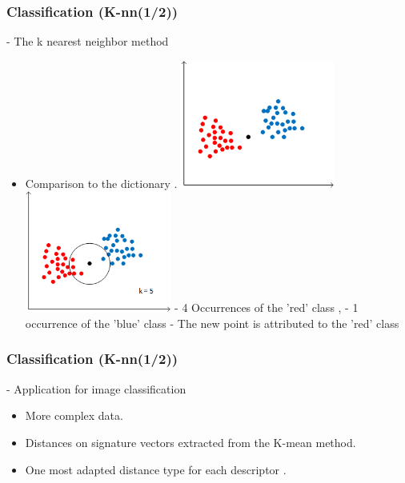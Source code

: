 \documentclass[xcolor=table]{beamer}
\begin{document}
\begin{frame}\frametitle{Classification (K-nn(1/2))}

- The k nearest neighbor method

\begin{itemize}
\item<1-> Comparison to the dictionary .
 {\includegraphics[height=4.2cm]{knnwc.png}} %
 {\includegraphics[height=4cm]{knnac.png}
\newline - 4 Occurrences of the 'red' class , - 1 occurrence of the 'blue' class \newline - The new point is attributed to the 'red' class}
\end{itemize}

\end{frame}

\begin{frame}\frametitle{Classification (K-nn(1/2))}

- Application for image classification

\begin{itemize}
\item More complex data.
\item Distances on signature vectors extracted from the K-mean method.
\item One most adapted distance type for each descriptor .
\end{itemize}

\end{frame}


\end{document}
